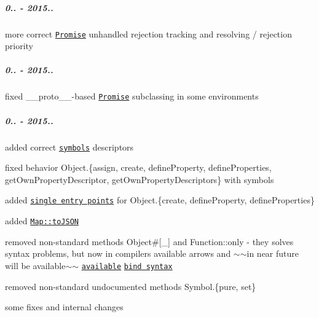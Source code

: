 \subparagraph*{0.. -\/ 2015..}


\begin{DoxyItemize}
\item more correct \href{https://github.com/zloirock/core-js/#ecmascript-6-promise}{\tt {\ttfamily Promise}} unhandled rejection tracking and resolving / rejection priority
\end{DoxyItemize}

\subparagraph*{0.. -\/ 2015..}


\begin{DoxyItemize}
\item fixed {\ttfamily \+\_\+\+\_\+proto\+\_\+\+\_\+}-\/based \href{https://github.com/zloirock/core-js/#ecmascript-6-promise}{\tt {\ttfamily Promise}} subclassing in some environments
\end{DoxyItemize}

\subparagraph*{0.. -\/ 2015..}


\begin{DoxyItemize}
\item added correct \href{https://github.com/zloirock/core-js/#ecmascript-6-symbol}{\tt symbols} descriptors
\begin{DoxyItemize}
\item fixed behavior {\ttfamily Object.\{assign, create, define\+Property, define\+Properties, get\+Own\+Property\+Descriptor, get\+Own\+Property\+Descriptors\}} with symbols
\item added \href{https://github.com/zloirock/core-js/#commonjs}{\tt single entry points} for {\ttfamily Object.\{create, define\+Property, define\+Properties\}}
\end{DoxyItemize}
\item added \href{https://github.com/zloirock/core-js/#ecmascript-7}{\tt {\ttfamily Map\+::to\+J\+S\+ON}}
\item removed non-\/standard methods {\ttfamily Object\#\mbox{[}\+\_\+\mbox{]}} and {\ttfamily Function\+::only} -\/ they solves syntax problems, but now in compilers available arrows and $\sim$$\sim$in near future will be available$\sim$$\sim$ \href{http://babeljs.io/blog/2015/05/14/function-bind/}{\tt available} \href{https://github.com/zenparsing/es-function-bind}{\tt bind syntax}
\item removed non-\/standard undocumented methods {\ttfamily Symbol.\{pure, set\}}
\item some fixes and internal changes
\end{DoxyItemize}

